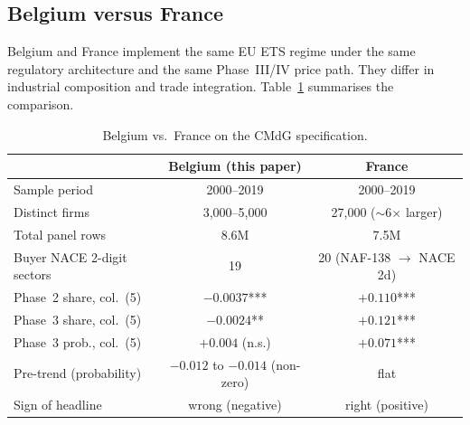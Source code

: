 \subsection{Belgium versus France}\label{sec:across:bevfrance}

Belgium and France implement the same EU ETS regime under the same regulatory architecture and the same Phase~III/IV price path. They differ in industrial composition and trade integration. Table~\ref{tab:bevfrance} summarises the comparison.

\begin{table}[H]
    \centering
    \caption{Belgium vs.\ France on the CMdG specification.}
    \label{tab:bevfrance}
    \footnotesize
    \begin{tabular}{lcc}
        \toprule
        & Belgium (this paper) & France \citep{CosterMejeanDiGiovanni2024} \\
        \midrule
        Sample period                  & 2000--2019                & 2000--2019 \\
        Distinct firms                 & 3{,}000--5{,}000          & 27{,}000 ($\sim$6$\times$ larger) \\
        Total panel rows               & 8.6M                      & 7.5M \\
        Buyer NACE 2-digit sectors     & 19                        & 20 (NAF-138 $\to$ NACE 2d) \\
        Phase~2 share, col.\ (5)       & $-0.0037$***              & $+0.110$*** \\
        Phase~3 share, col.\ (5)       & $-0.0024$**               & $+0.121$*** \\
        Phase~3 prob., col.\ (5)       & $+0.004$ (n.s.)           & $+0.071$*** \\
        Pre-trend (probability)        & $-0.012$ to $-0.014$ (non-zero) & flat \\
        Sign of headline               & wrong (negative)          & right (positive) \\
        \bottomrule
    \end{tabular}
\end{table}

